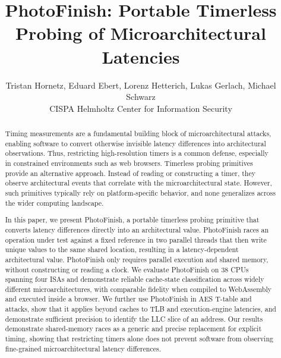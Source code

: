 \documentclass[letterpaper,twocolumn,10pt]{article} %
\newcommand{\AttackName}{PhotoFinish\xspace}
\newcommand{\PlatformCount}{38\xspace}
\begin{document}
\title{\AttackName: Portable Timerless Probing of Microarchitectural Latencies}

\author{
  {\rm Tristan Hornetz, Eduard Ebert, Lorenz Hetterich, Lukas Gerlach, Michael Schwarz}\\
  CISPA Helmholtz Center for Information Security
}

\maketitle

\begin{abstract}
Timing measurements are a fundamental building block of microarchitectural attacks, enabling software to convert otherwise invisible latency differences into architectural observations.
Thus, restricting high-resolution timers is a common defense, especially in constrained environments such as web browsers.
Timerless probing primitives provide an alternative approach.
Instead of reading or constructing a timer, they observe architectural events that correlate with the microarchitectural state.
However, such primitives typically rely on platform-specific behavior, and none generalizes across the wider computing landscape.

In this paper, we present \AttackName, a portable timerless probing primitive that converts latency differences directly into an architectural value.
\AttackName races an operation under test against a fixed reference in two parallel threads that then write unique values to the same shared location, resulting in a latency-dependent architectural value.
\AttackName only requires parallel execution and shared memory, without constructing or reading a clock.
We evaluate \AttackName on \PlatformCount CPUs spanning four ISAs and demonstrate reliable cache-state classification across widely different microarchitectures, with comparable fidelity when compiled to WebAssembly and executed inside a browser.
We further use \AttackName in AES T-table and \EvictReload attacks, show that it applies beyond caches to TLB and execution-engine latencies, and demonstrate sufficient precision to identify the LLC slice of an address.
Our results demonstrate shared-memory races as a generic and precise replacement for explicit timing, showing that restricting timers alone does not prevent software from observing fine-grained microarchitectural latency differences.
\end{abstract}
\end{document}
